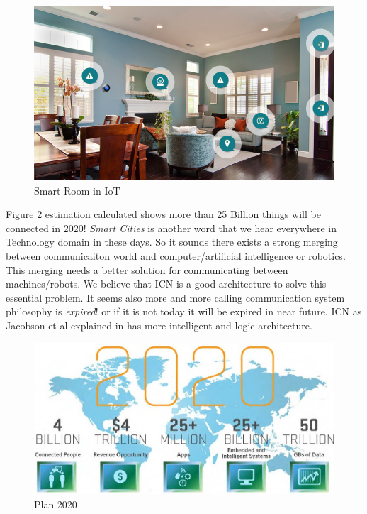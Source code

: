 \begin{figure}[H]

\begin{center}

\includegraphics[scale = 0.35]{Pictures/internetofthings.png}

\caption{Smart Room in IoT} \label{internetofthings} 

\end{center}

\end{figure}

Figure \ref{2020} estimation calculated shows more than 25 Billion things will be connected in 2020! \textit{Smart Cities} is another word that we hear everywhere in Technology domain in these days. So it sounds there exists a strong merging between communicaiton world and computer/artificial intelligence or robotics. This merging needs a better solution for communicating between machines/robots. We believe that ICN is a good architecture to solve this essential problem. It seems also more and more calling communication system philosophy is \textit{expired}! or if it is not today it will be expired in near future. ICN as Jacobson et al explained in \cite{jacobson} has more intelligent and logic architecture.


\begin{figure}[H]

\begin{center}

\includegraphics[scale = 0.31]{Pictures/2020.jpg}

\caption{Plan 2020} \label{2020} 

\end{center}

\end{figure}


